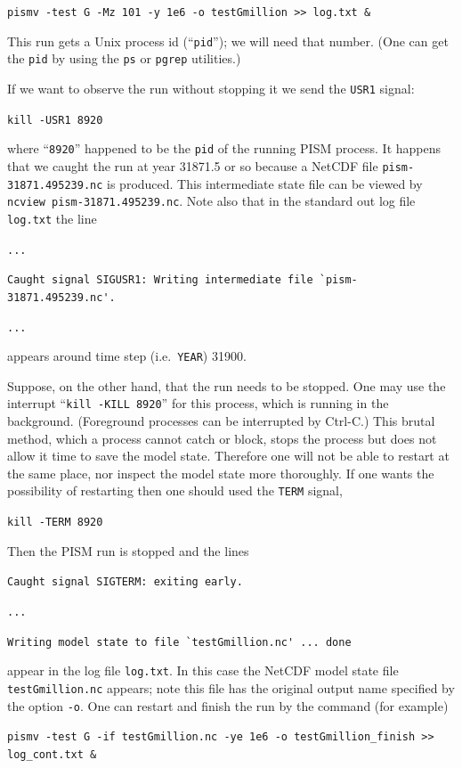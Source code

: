 \documentclass[11pt,final]{amsart}
\begin{document}
\verb|pismv -test G -Mz 101 -y 1e6 -o testGmillion >> log.txt &|

\noindent This run gets a Unix process id (``\verb|pid|''); we will need that number.  (One can get the \verb|pid| by using the \verb|ps| or \verb|pgrep| utilities.)

If we want to observe the run without stopping it we send the \verb|USR1| signal:

\verb|kill -USR1 8920|

\noindent where ``\verb|8920|'' happened to be the \verb|pid| of the running PISM process.  It happens that we caught the run at year 31871.5 or so because a NetCDF file \verb|pism-31871.495239.nc| is produced.  This intermediate state file can be viewed by \verb|ncview pism-31871.495239.nc|.  Note also that in the standard out log file \verb|log.txt| the line

\verb|...|

\verb|Caught signal SIGUSR1: Writing intermediate file `pism-31871.495239.nc'.|

\verb|...|

\noindent appears around time step (i.e.~\verb|YEAR|) 31900.

Suppose, on the other hand, that the run needs to be stopped.  One may use the interrupt ``\verb|kill -KILL 8920|'' for this process, which is running in the background.  (Foreground processes can be interrupted by Ctrl-C.)  This brutal method, which a process cannot catch or block, stops the process but does not allow it  time to save the model state.  Therefore one will not be able to restart at the same place, nor inspect the model state more thoroughly.  If one wants the possibility of restarting then one should used the \verb|TERM| signal,

\verb|kill -TERM 8920|

\noindent Then the PISM run is stopped and the lines

\verb|Caught signal SIGTERM: exiting early.|

\verb|...|

\verb|Writing model state to file `testGmillion.nc' ... done|

\noindent appear in the log file \verb|log.txt|.  In this case the NetCDF model state file \verb|testGmillion.nc| appears; note this file has the original output name specified by the option \verb|-o|.  One can restart and finish the run by the command (for example)

\verb|pismv -test G -if testGmillion.nc -ye 1e6 -o testGmillion_finish >> log_cont.txt &|
\smallskip
\end{document}
